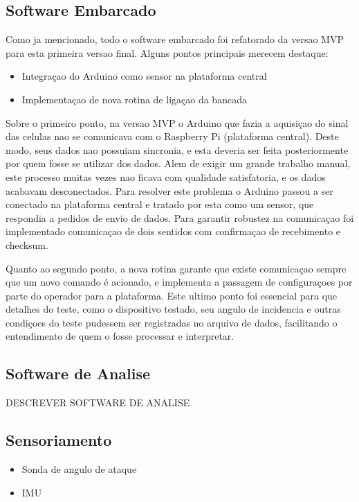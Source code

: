 \subsection{Software Embarcado}

Como ja mencionado, todo o software embarcado foi refatorado da versao MVP para esta primeira versao final. Alguns pontos principais merecem destaque:

\begin{itemize}
    \item Integraçao do Arduino como sensor na plataforma central
    
    \item Implementaçao de nova rotina de ligaçao da bancada 
\end{itemize}

Sobre o primeiro ponto, na versao MVP o Arduino que fazia a aquisiçao do sinal das celulas nao se comunicava com o Raspberry Pi (plataforma central). Deste modo, seus dados nao possuiam sincronia, e esta deveria ser feita posteriormente por quem fosse se utilizar dos dados. Alem de exigir um grande trabalho manual, este processo muitas vezes nao ficava com qualidade satisfatoria, e os dados acabavam desconectados. Para resolver este problema o Arduino passou a ser conectado na plataforma central e tratado por esta como um sensor, que respondia a pedidos de envio de dados. Para garantir robustez na comunicaçao foi implementado comunicaçao de dois sentidos com confirmaçao de recebimento e checksum.  

Quanto ao segundo ponto, a nova rotina garante que existe comunicaçao sempre que um novo comando é acionado, e implementa a passagem de configuraçoes por parte do operador para a plataforma. Este ultimo ponto foi essencial para que detalhes do teste, como o dispositivo testado, seu angulo de incidencia e outras condiçoes do teste pudessem ser registradas no arquivo de dados, facilitando o entendimento de quem o fosse processar e interpretar.

\subsection{Software de Analise}

DESCREVER SOFTWARE DE ANALISE

\subsection{Sensoriamento}

\begin{itemize}
    \item Sonda de angulo de ataque
    \item IMU
\end{itemize}

